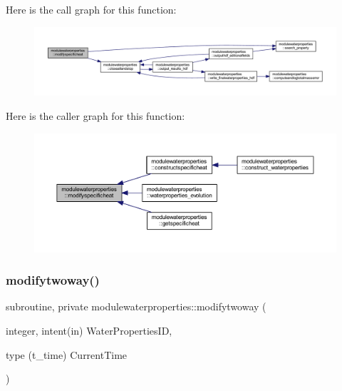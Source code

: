 Here is the call graph for this function\+:\nopagebreak
\begin{figure}[H]
\begin{center}
\leavevmode
\includegraphics[width=350pt]{namespacemodulewaterproperties_ac377b27826c6ced4a835d6e47384f917_cgraph}
\end{center}
\end{figure}
Here is the caller graph for this function\+:\nopagebreak
\begin{figure}[H]
\begin{center}
\leavevmode
\includegraphics[width=350pt]{namespacemodulewaterproperties_ac377b27826c6ced4a835d6e47384f917_icgraph}
\end{center}
\end{figure}
\mbox{\label{namespacemodulewaterproperties_aa39cc64df05076f8396e1894e6e74ad5}} 
\subsubsection{\texorpdfstring{modifytwoway()}{modifytwoway()}}
{\footnotesize\ttfamily subroutine, private modulewaterproperties\+::modifytwoway (\begin{DoxyParamCaption}\item[{integer, intent(in)}]{Water\+Properties\+ID,  }\item[{type (t\+\_\+time)}]{Current\+Time }\end{DoxyParamCaption})\hspace{0.3cm}{\ttfamily [private]}}

